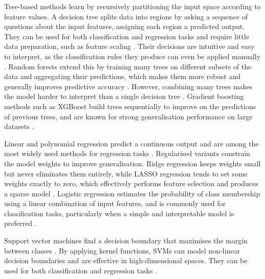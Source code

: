 Tree-based methods learn by recursively partitioning the input space 
according to feature values. A decision tree splits data into regions 
by asking a sequence of questions about the input features, assigning 
each region a predicted output. They can be used for both 
classification and regression tasks and require little data 
preparation, such as feature scaling 
\parencite[Chapter~6]{geron2019hands_on_machine_learning,
sarker2021machine_learning_algorithms_real_world_applications_research_directions}. 
Their decisions are intuitive and easy to interpret, as the 
classification rules they produce can even be applied manually 
\parencite[Chapter~6]{geron2019hands_on_machine_learning}.
Random forests extend this by training many trees on different 
subsets of the data and aggregating their predictions, which makes 
them more robust and generally improves predictive accuracy 
\parencite{breiman2001random_forests}. 
However, combining many trees makes the model harder to interpret 
than a single decision tree 
\parencite[Chapter~6]{geron2019hands_on_machine_learning}. 
Gradient boosting methods such as XGBoost build trees sequentially 
to improve on the predictions of previous trees, and are known for 
strong generalisation performance on large datasets
\parencite{chen2016xgboost,
sarker2021machine_learning_algorithms_real_world_applications_research_directions}.

Linear and polynomial regression predict a continuous output and 
are among the most widely used methods for regression tasks 
\parencite{sarker2021machine_learning_algorithms_real_world_applications_research_directions}. 
Regularised variants constrain the model weights to improve 
generalisation. Ridge regression keeps weights small but never 
eliminates them entirely, while LASSO regression tends to set some 
weights exactly to zero, which effectively performs feature 
selection and produces a sparse model 
\parencite{tibshirani1996regression_lasso_ridge, 
geron2019hands_on_machine_learning}. 
Logistic regression estimates the probability of class membership 
using a linear combination of input features, and is commonly used 
for classification tasks, particularly when a simple and 
interpretable model is preferred 
\parencite[Chapter~4]{geron2019hands_on_machine_learning,
sarker2021machine_learning_algorithms_real_world_applications_research_directions}.

Support vector machines find a decision boundary that maximises 
the margin between classes 
\parencite{cortes1995support_vector_networks}. 
By applying kernel functions, SVMs can model non-linear decision 
boundaries and are effective in high-dimensional spaces. They can 
be used for both classification and regression tasks 
\parencite[Chapter~5]{geron2019hands_on_machine_learning,
sarker2021machine_learning_algorithms_real_world_applications_research_directions}.

